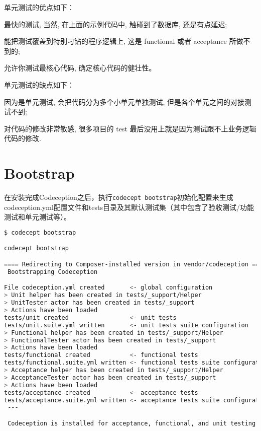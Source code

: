 单元测试的优点如下：

\begin{compactitem}
\item 最快的测试, 当然, 在上面的示例代码中, 触碰到了数据库, 还是有点延迟;
\item 能把测试覆盖到特别刁钻的程序逻辑上, 这是 functional 或者 acceptance 所做不到的;
\item 允许你测试最核心代码, 确定核心代码的健壮性。
\end{compactitem}

单元测试的缺点如下：

\begin{compactitem}
\item 因为是单元测试, 会把代码分为多个小单元单独测试, 但是各个单元之间的对接测试不到;
\item 对代码的修改非常敏感, 很多项目的 test 最后没用上就是因为测试跟不上业务逻辑代码的修改.
\end{compactitem}


\chapter{Bootstrap}







在安装完成Codeception之后，执行\texttt{codecept bootstrap}初始化配置来生成codeception.yml配置文件和tests目录及其默认测试集（其中包含了验收测试/功能测试和单元测试等）。



\begin{lstlisting}[language=bash]
$ codecept bootstrap

codecept bootstrap

==== Redirecting to Composer-installed version in vendor/codeception ====
 Bootstrapping Codeception 

File codeception.yml created       <- global configuration
> Unit helper has been created in tests/_support/Helper
> UnitTester actor has been created in tests/_support
> Actions have been loaded
tests/unit created                 <- unit tests
tests/unit.suite.yml written       <- unit tests suite configuration
> Functional helper has been created in tests/_support/Helper
> FunctionalTester actor has been created in tests/_support
> Actions have been loaded
tests/functional created           <- functional tests
tests/functional.suite.yml written <- functional tests suite configuration
> Acceptance helper has been created in tests/_support/Helper
> AcceptanceTester actor has been created in tests/_support
> Actions have been loaded
tests/acceptance created           <- acceptance tests
tests/acceptance.suite.yml written <- acceptance tests suite configuration
 --- 

 Codeception is installed for acceptance, functional, and unit testing 
\end{lstlisting}


